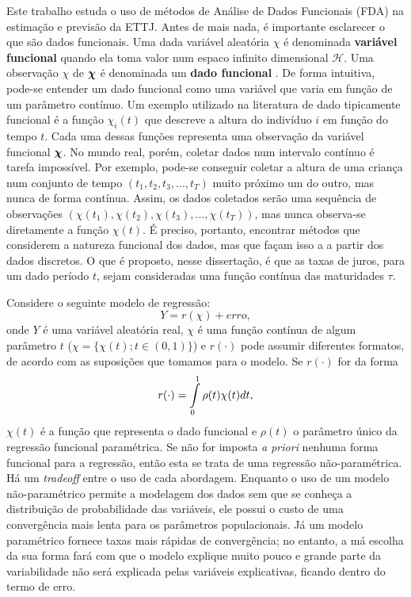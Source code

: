 \documentclass[
	12pt,				%
	openright,			%
	oneside,			%
	a4paper,			%
	english,			%
	brazil				%
	]{dissertacao-ufrgs-abntex2}
\begin{document}
Este trabalho estuda o uso de métodos de Análise de Dados Funcionais (FDA) na estimação e previsão da ETTJ. Antes de mais nada, é importante esclarecer o que são dados funcionais.
Uma dada variável aleatória $\chi$ é denominada \textbf{variável
funcional }quando ela toma valor num espaco infinito dimensional $\mathcal{H}$.
Uma observação $\chi$ de $\mathcal{\boldsymbol{\chi}}$ é denominada um \textbf{dado
funcional} \cite{vieu_nonparametric_2006}.
De forma intuitiva, pode-se entender um dado funcional como uma variável
que varia em função de um parâmetro contínuo. Um exemplo utilizado
na literatura de dado tipicamente funcional é a função $\chi_{i}(t)$
que descreve a altura do indivíduo $i$ em função do tempo $t$. Cada
uma dessas funções representa uma observação da variável funcional
$\boldsymbol{\chi}$. 
No mundo real, porém, coletar dados num intervalo contínuo é tarefa
impossível. Por exemplo, pode-se conseguir coletar a altura de uma
criança num conjunto de tempo $(t_{1},t_{2},t_{3},...,t_{T})$ muito
próximo um do outro, mas nunca de forma contínua. Assim, os dados coletados serão 
uma sequência de observações $(\chi(t_{1}),\chi(t_{2}),\chi(t_{3}),...,\chi(t_{T}))$,
mas nunca observa-se diretamente a função $\chi(t)$. É preciso, portanto, encontrar
métodos que considerem a natureza funcional dos dados, mas que façam isso a a partir dos dados discretos.
O que é proposto, nesse dissertação, é que as taxas de juros, para um dado período $t$, sejam consideradas uma função contínua das maturidades $\tau$.

Considere o seguinte modelo de regressão:
\begin{equation}
Y=r(\chi)+erro,\label{eq:modelo_regressao_basica}
\end{equation}
onde $Y$ é uma variável aleatória real, $\chi$ é uma função contínua
de algum parâmetro $t$ ($\chi=\{\chi(t);t\in(0,1)\}$) e $r(\cdot)$
pode assumir diferentes formatos, de acordo com as suposições que
tomamos para o modelo. Se $r(\cdot)$ for da forma
\begin{equation}
r(\cdot)=\intop_{0}^{1}\rho(t)\chi(t)dt,
\end{equation}
$\chi(t)$ é a função que representa o dado funcional e $\rho(t)$
o parâmetro único da regressão funcional paramétrica. Se não for imposta
\emph{a priori} nenhuma forma funcional para a regressão, então esta
se trata de uma regressão não-paramétrica.
Há um \emph{tradeoff} entre o uso de cada abordagem. Enquanto o uso de um
modelo não-paramétrico permite a modelagem dos dados sem que se conheça
a distribuição de probabilidade das variáveis, ele possui o custo
de uma convergência mais lenta para os parâmetros populacionais. Já
um modelo paramétrico fornece taxas mais rápidas de convergência;
no entanto, a má escolha da sua forma fará com que o modelo explique
muito pouco e grande parte da variabilidade não será explicada pelas
variáveis explicativas, ficando dentro do termo de erro.
\end{document}
